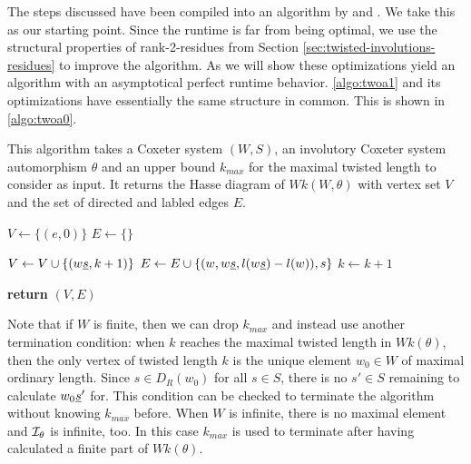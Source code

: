 The steps discussed have been compiled into an algorithm by \cite[Algorithm 2.4]{brennemann:twoa} and \cite[Algorithm 3.1.1]{haas:twoa}. We take this as our starting point. Since the runtime is far from being optimal, we use the structural properties of rank-2-residues from Section \ref{sec:twisted-involutions-residues} to improve the algorithm. As we will show these optimizations yield an algorithm with an asymptotical perfect runtime behavior. \ref{algo:twoa1} and its optimizations have essentially the same structure in common. This is shown in \ref{algo:twoa0}.

\begin{algo}[TWOABase]
	This algorithm takes a Coxeter system $(W,S)$, an involutory Coxeter system automorphism $\theta$ and an upper bound $k_{max}$ for the maximal twisted length to consider as input. It returns the Hasse diagram of $Wk(W,\theta)$ with vertex set $V$ and the set of directed and labled edges $E$.
	\begin{algorithmic}[1]
	\State $V \gets \{(e,0)\}$
	\State $E \gets \{\}$

	 \label{algo:twoa0-k-loop}
		 \label{algo:twoa0-v-loop}
			 \label{algo:twoa0-s-loop} 
				 \label{algo:twoa0-decision} 
					\State $V \gets V \cup \{ (w \underline{s},k+1) \}$
				\EndIf
				\State $E \gets E \cup \{ (w,w \underline{s},l(w \underline{s}) - l(w)),s \}$
			\EndFor
		\EndFor
		\State $k \gets k + 1$
	\EndFor

	\State \textbf{return} $(V,E)$
	\EndProcedure
	\end{algorithmic}
\end{algo}

\begin{rema}
	Note that if $W$ is finite, then we can drop $k_{max}$ and instead use another termination condition: when $k$ reaches the maximal twisted length in $Wk(\theta)$, then the only vertex of twisted length $k$ is the unique element $w_0 \in W$ of maximal ordinary length. Since $s \in D_R(w_0)$ for all $s \in S$, there is no $s' \in S$ remaining to calculate $w_0 \underline{s}'$ for. This condition can be checked to terminate the algorithm without knowing $k_{max}$ before. When $W$ is infinite, there is no maximal element and $\mathcal{I}_{\theta}$ is infinite, too. In this case $k_{max}$ is used to terminate after having calculated a finite part of $Wk(\theta)$.
\end{rema}

